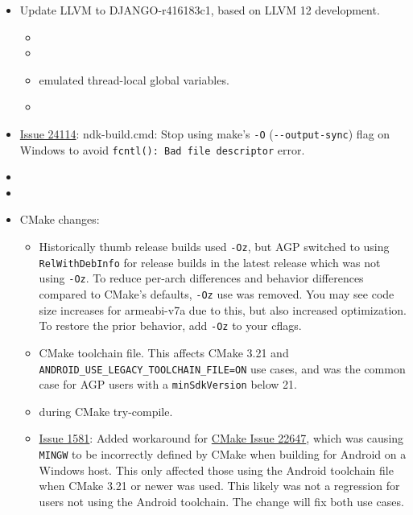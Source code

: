 \begin{itemize}
\tightlist
\item
  Update LLVM to DJANGO-r416183c1, based on LLVM 12 development.

  \begin{itemize}
  \tightlist
  \item
  \item
  \item
    emulated thread-local global variables.
  \item
  \end{itemize}
\item
  \href{https://github.com/android/ndk/issues/1492}{Issue 24114}:
  ndk-build.cmd: Stop using make's \texttt{-O}
  (\texttt{-\/-output-sync}) flag on Windows to avoid
  \texttt{fcntl():\ Bad\ file\ descriptor} error.
\item
\item
\item
  CMake changes:

  \begin{itemize}
  \tightlist
  \item
    Historically thumb release builds used \texttt{-Oz}, but AGP
    switched to using \texttt{RelWithDebInfo} for release builds in the
    latest release which was not using \texttt{-Oz}. To reduce per-arch
    differences and behavior differences compared to CMake's defaults,
    \texttt{-Oz} use was removed. You may see code size increases for
    armeabi-v7a due to this, but also increased optimization. To restore
    the prior behavior, add \texttt{-Oz} to your cflags.
  \item
    CMake toolchain file. This affects CMake 3.21 and
    \texttt{ANDROID\_USE\_LEGACY\_TOOLCHAIN\_FILE=ON} use cases, and was
    the common case for AGP users with a \texttt{minSdkVersion} below
    21.
  \item
    during CMake try-compile.
  \item
    \href{https://github.com/android/ndk/issues/1581}{Issue 1581}: Added
    workaround for
    \href{https://gitlab.kitware.com/cmake/cmake/-/issues/22647}{CMake
    Issue 22647}, which was causing \texttt{MINGW} to be incorrectly
    defined by CMake when building for Android on a Windows host. This
    only affected those using the Android toolchain file when CMake 3.21
    or newer was used. This likely was not a regression for users not
    using the Android toolchain. The change will fix both use cases.
  \end{itemize}
\end{itemize}


